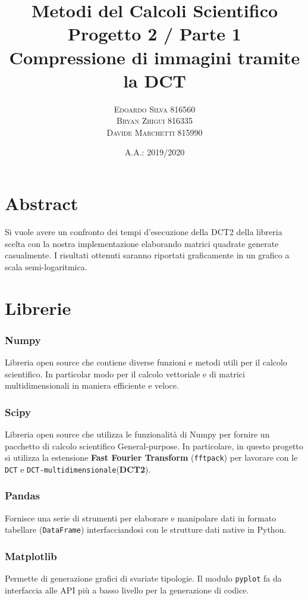 \documentclass[11pt,italian]{article}
\title{
	Metodi del Calcoli Scientifico \\
	\normalsize Progetto 2 / Parte 1 \\
	\normalsize Compressione di immagini tramite la DCT
}
\date{A.A.: 2019/2020}
\author{
	\normalsize
	\textsc{Edoardo Silva 816560} \\
	\normalsize
	\textsc{Bryan Zhigui 816335} \\
	\normalsize
	\textsc{Davide Marchetti 815990}
}
\begin{document}
\maketitle

\section*{Abstract}
Si vuole avere un confronto dei tempi d’esecuzione della DCT2 della libreria scelta con la nostra implementazione elaborando matrici quadrate generate casualmente.
I risultati ottenuti saranno riportati graficamente in un grafico a scala semi-logaritmica.

\section{Librerie}
\subsubsection*{Numpy}
Libreria open source che contiene diverse funzioni e metodi utili per il calcolo scientifico. In particolar modo per il calcolo vettoriale e di matrici multidimensionali in maniera efficiente e veloce.

\subsubsection*{Scipy}
Libreria open source che utilizza le funzionalità di Numpy per fornire un pacchetto di calcolo scientifico General-purpose. In particolare, in questo progetto si utilizza la estensione \textbf{Fast Fourier Transform} (\lstinline{fftpack}) per lavorare con le \lstinline{DCT} e \lstinline{DCT-multidimensionale}(\textbf{DCT2}).

\subsubsection*{Pandas}
Fornisce una serie di strumenti per elaborare e manipolare dati in formato tabellare (\lstinline{DataFrame}) interfacciandosi con le strutture dati native in Python.

\subsubsection*{Matplotlib}
Permette di generazione grafici di svariate tipologie.
Il modulo \lstinline{pyplot} fa da interfaccia alle API più a basso livello per la generazione di codice.
\end{document}

